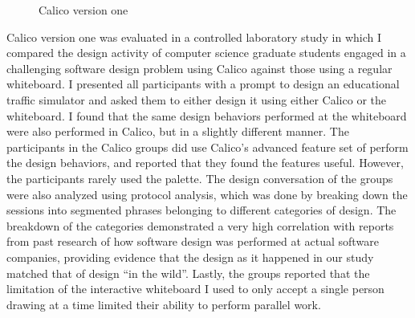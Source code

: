 \begin{figure}
  \centering
   \caption {Calico version one}
   \label{fig:calico-version-one}
\end{figure}

Calico version one was evaluated in a controlled laboratory study in which I compared the design activity of computer science graduate students engaged in a challenging software design problem using Calico against those using a regular whiteboard. I presented all participants with a prompt to design an educational traffic simulator and asked them to either design it using either Calico or the whiteboard. I found that the same design behaviors performed at the whiteboard were also performed in Calico, but in a slightly different manner. The participants in the Calico groups did use Calico's advanced feature set of perform the design behaviors, and reported that they found the features useful. However, the participants rarely used the palette. The design conversation of the groups were also analyzed using protocol analysis, which was done by breaking down the sessions into segmented phrases belonging to different categories of design. The breakdown of the categories demonstrated a very high correlation with reports from past research of how software design was performed at actual software companies, providing evidence that the design as it happened in our study matched that of design ``in the wild''. Lastly, the groups reported that the limitation of the interactive whiteboard I used to only accept a single person drawing at a time limited their ability to perform parallel work.


